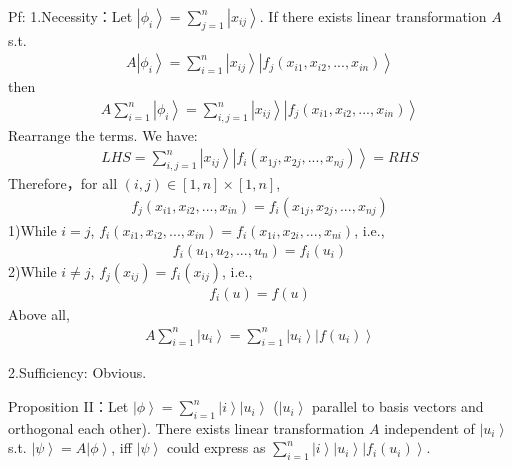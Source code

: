 \documentclass[%
 reprint,
 amsmath,amssymb,
pra,
]{revtex4-1}
\begin{document}
\noindent Pf: 1.Necessity：Let $\left|\phi_i\right\rangle = \sum_{j=1}^n \left|x_{ij}\right\rangle$. If there exists linear transformation $A$ s.t.
\begin{align*}
A\left|\phi_i\right\rangle = \sum_{i=1}^n\left|x_{ij}\right\rangle\left|f_{j}\left(x_{i1}, x_{i2}, ..., x_{in}\right)\right\rangle
\end{align*}
then
\begin{align*}
A\sum_{i=1}^{n}\left|\phi_i\right\rangle = \sum_{i, j=1}^n\left|x_{ij}\right\rangle\left|f_{j}\left(x_{i1}, x_{i2}, ..., x_{in}\right)\right\rangle
\end{align*}
Rearrange the terms. We have: 
\begin{align*}
LHS = \sum_{i, j=1}^n\left|x_{ij}\right\rangle\left|f_{i}\left(x_{1j}, x_{2j}, ..., x_{nj}\right)\right\rangle = RHS
\end{align*}
Therefore，for all $\left(i, j\right) \in \left[1, n\right]\times\left[1, n\right]$, 
\begin{align*}
f_{j}\left(x_{i1}, x_{i2}, ..., x_{in}\right) = f_{i}\left(x_{1j}, x_{2j}, ..., x_{nj}\right)
\end{align*}
1)While $i=j$, $f_{i}\left(x_{i1}, x_{i2}, ..., x_{in}\right) = f_{i}\left(x_{1i}, x_{2i}, ..., x_{ni}\right)$, i.e., 
\begin{align*}
f_i\left(u_1, u_2, ...,u_n\right) = f_i\left(u_i\right)
\end{align*}
2)While $i\neq j$, $f_j\left(x_{ij}\right) = f_i\left(x_{ij}\right)$, i.e., 
\begin{align*}
f_i\left(u\right) = f\left(u\right)
\end{align*}
Above all, 
\begin{align*}
A\sum_{i=1}^{n}\left|u_i\right\rangle = \sum_{i=1}^{n}\left|u_i\right\rangle\left|f\left(u_i\right)\right\rangle
\end{align*}

2.Sufficiency: Obvious.

\noindent Proposition II：Let $\left|\phi\right\rangle = \sum_{i=1}^n \left|i\right\rangle\left|u_i\right\rangle$ ($\left|u_i\right\rangle$ parallel to basis vectors and orthogonal each other). There exists 
linear transformation $A$ independent of $\left|u_{i}\right\rangle$ s.t. $\left|\psi\right\rangle = A\left|\phi\right\rangle$, iff $\left|\psi\right\rangle$ could express as $\sum_{i=1}^n \left|i\right\rangle\left|u_i\right\rangle\left|f_{i}\left(u_i\right)\right\rangle$.
\end{document}
